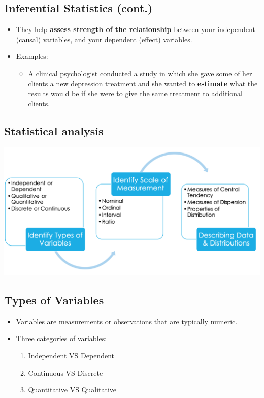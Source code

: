 \documentclass[]{article}
\providecommand{\tightlist}{%
  \setlength{\itemsep}{0pt}\setlength{\parskip}{0pt}}
\begin{document}
\hypertarget{inferential-statistics-cont.}{%
\subsection{Inferential Statistics
(cont.)}\label{inferential-statistics-cont.}}

\begin{itemize}
\tightlist
\item
  They help {\textbf{assess strength of the relationship}} between your
  independent (causal) variables, and your dependent (effect) variables.
\item
  Examples:

  \begin{itemize}
  \tightlist
  \item
    A clinical psychologist conducted a study in which she gave some of
    her clients a new depression treatment and she wanted to
    {\textbf{estimate}} what the results would be if she were to give
    the same treatment to additional clients.
  \end{itemize}
\end{itemize}

\hypertarget{statistical-analysis}{%
\subsection{Statistical analysis}\label{statistical-analysis}}

\includegraphics[width=1.05\linewidth]{figure/Ch1-Fig1}

\hypertarget{types-of-variables}{%
\subsection{Types of Variables}\label{types-of-variables}}

\begin{itemize}
\item
  Variables are measurements or observations that are typically numeric.
\item
  Three categories of variables:

  \begin{enumerate}
  \def\labelenumi{\arabic{enumi}.}
  \tightlist
  \item
    Independent VS Dependent
  \item
    Continuous VS Discrete
  \item
    Quantitative VS Qualitative
  \end{enumerate}
\end{itemize}
\end{document}
